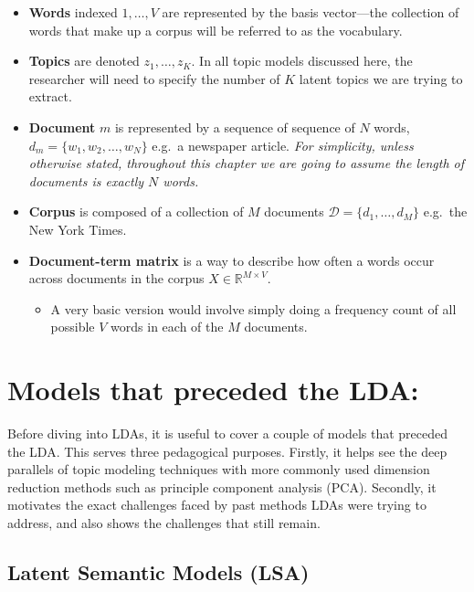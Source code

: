 \documentclass[
]{book}
\providecommand{\tightlist}{%
  \setlength{\itemsep}{0pt}\setlength{\parskip}{0pt}}
\begin{document}
\begin{itemize}
\tightlist
\item
  \textbf{Words} indexed \(1,\dots,V\) are represented by the basis vector---the collection of words that make up a corpus will be referred to as the vocabulary.
\item
  \textbf{Topics} are denoted \(z_1,\dots,z_K\). In all topic models discussed here, the researcher will need to specify the number of \(K\) latent topics we are trying to extract.
\item
  \textbf{Document} \(m\) is represented by a sequence of sequence of \(N\) words, \(d_m = \{w_1,w_2,\dots,w_N\}\) e.g.~a newspaper article. \emph{For simplicity, unless otherwise stated, throughout this chapter we are going to assume the length of documents is exactly \(N\) words.}
\item
  \textbf{Corpus} is composed of a collection of \(M\) documents \(\mathcal{D}=\{d_1,\dots, d_M\}\) e.g.~the New York Times.
\item
  \textbf{Document-term matrix} is a way to describe how often a words occur across documents in the corpus \(X\in \mathbb{R}^{M\times V}\).

  \begin{itemize}
  \tightlist
  \item
    A very basic version would involve simply doing a frequency count of all possible \(V\) words in each of the \(M\) documents.
  \end{itemize}
\end{itemize}

\hypertarget{models-that-preceded-the-lda}{%
\section{Models that preceded the LDA:}\label{models-that-preceded-the-lda}}

Before diving into LDAs, it is useful to cover a couple of models that preceded the LDA. This serves three pedagogical purposes. Firstly, it helps see the deep parallels of topic modeling techniques with more commonly used dimension reduction methods such as principle component analysis (PCA). Secondly, it motivates the exact challenges faced by past methods LDAs were trying to address, and also shows the challenges that still remain.

\hypertarget{latent-semantic-models-lsa}{%
\subsection{Latent Semantic Models (LSA)}\label{latent-semantic-models-lsa}}
\end{document}
